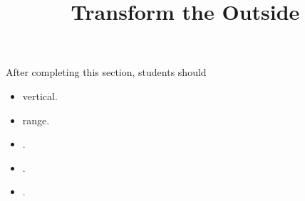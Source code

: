 \documentclass{ximera}
\title{Transform the Outside}
\begin{document}
\begin{abstract}
\end{abstract}
\maketitle

\begin{sectionOutcomes}
After completing this section, students should 

\begin{itemize}
\item vertical.
\item range.
\item .
\item .
\item .
\end{itemize}
\end{sectionOutcomes}
\end{document}

